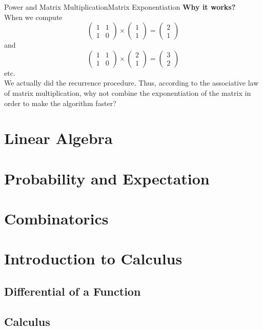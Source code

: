 \documentclass[mathserif,10pt]{beamer}
\begin{document}
\begin{frame}{Power and Matrix Multiplication}{Matrix Exponentiation}
\textbf{\large Why it works?} \\[0.5cm]
When we compute
\begin{equation}
	\left(
	\begin{array}{cc}
		1 & 1 \\
		1 & 0
	\end{array}
	\right) \times 
	\left(
	\begin{array}{c}
		1 \\
		1
	\end{array}
	\right) = 
	\left(
	\begin{array}{cc}
		2 \\
		1
	\end{array}
	\right)
	\nonumber
	\end{equation}
and
	\begin{equation}
	\left(
	\begin{array}{cc}
		1 & 1 \\
		1 & 0
	\end{array}
	\right) \times 
	\left(
	\begin{array}{c}
		2 \\
		1
	\end{array}
	\right) = 
	\left(
	\begin{array}{cc}
		3 \\
		2
	\end{array}
	\right)
	\nonumber
	\end{equation}
etc. \\
We actually did the recurrence procedure. Thus, according to the associative law of matrix multiplication, why not combine the exponentiation of the matrix in order to make the algorithm faster?
\end{frame}

\section{Linear Algebra}
\section{Probability and Expectation}
\section{Combinatorics}
\section{Introduction to Calculus}
\subsection{Differential of a Function}
\subsection{Calculus}




{\1
\begin{frame}
\end{frame}}
\end{document}
